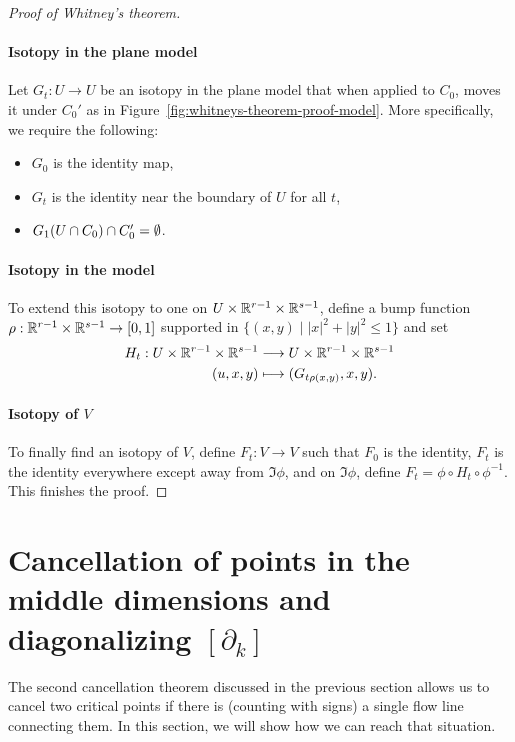 \begin{proof}[Proof of Whitney's theorem]
    \paragraph{Isotopy in the plane model}
    Let $G_t: U \to U$ be an isotopy in the plane model that when applied to $C_0$, moves it under $C_0'$ as in Figure~\ref{fig:whitneys-theorem-proof-model}.
    More specifically, we require the following:
    \begin{itemize}
        \item $G_0$ is the identity map,
        \item $G_t$ is the identity near the boundary of  $U$ for all $t$,
        \item  $ G_1(U \cap C_0) \cap C_0' = \emptyset$.
    \end{itemize}
    \paragraph{Isotopy in the model}
    To extend this isotopy to one on $U \times \mathbb{R}^{r-1} \times \mathbb{R}^{s-1}$, define a bump function $\rho: \mathbb{R}^{r-1}\times \mathbb{R}^{s-1} \to  [0,1]$ supported in $\{(x, y)  \mid |x|^2 + |y|^2 \le  1\}$ and set
    \begin{align*}
        H_t: U \times \mathbb{R}^{r-1}\times \mathbb{R}^{s-1} &\longrightarrow  U \times \mathbb{R}^{r-1} \times \mathbb{R}^{s-1}\\
        (u, x, y) &\longmapsto (G_{t \rho(x, y)}, x, y)
    .\end{align*}
    \paragraph{Isotopy of $V$}
    To finally find an isotopy of $V$, define $F_t: V\to V$ such that
    $F_0$ is the identity, $F_t$ is the identity everywhere except away from  $\Im \phi$, and on  $\Im \phi$, define  $F_t = \phi  \circ  H_t  \circ  \phi^{-1}$.
    This finishes the proof.
\end{proof}

\section{Cancellation of points in the middle dimensions and diagonalizing $[\partial_k]$}

The second cancellation theorem discussed in the previous section allows us to cancel two critical points if there is (counting with signs) a single flow line connecting them.
In this section, we will show how we can reach that situation.

